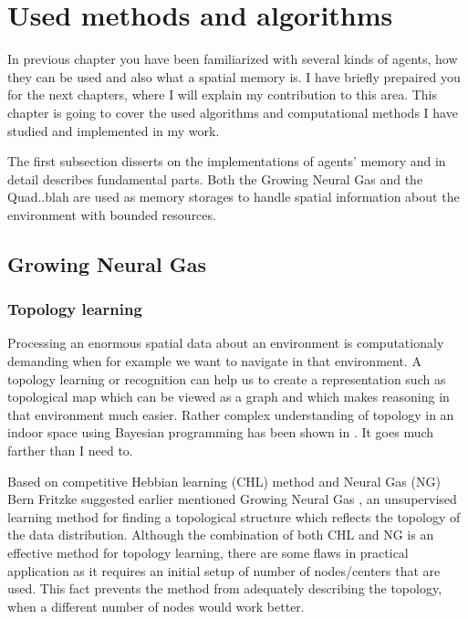 \chapter{Used methods and algorithms}

In previous chapter you have been familiarized with several kinds of agents, how they can be used and also what a spatial memory is. I have briefly prepaired you for the next chapters, where I will explain my contribution to this area. This chapter is going to cover the used algorithms and computational methods I have studied and implemented in my work. 

The first subsection disserts on the implementations of agents' memory and in detail describes fundamental parts. Both the Growing Neural Gas and the Quad..blah are used as memory storages to handle spatial information about the environment with bounded resources.

\section{Growing Neural Gas}

\subsection{Topology learning}

Processing an enormous spatial data about an environment is computationaly demanding when for example we want to navigate in that environment. A topology learning or recognition can help us to create a representation such as topological map which can be viewed as a graph and which makes reasoning in that environment much easier. Rather complex understanding of topology in an indoor space using Bayesian programming has been shown in \cite{Tapus:topologylearning}. It goes much farther than I need to. 

Based on competitive Hebbian learning (CHL) method \cite{Martinetz:chl} and Neural Gas (NG) \cite{Martinetz:ng} Bern Fritzke suggested earlier mentioned Growing Neural Gas \cite{Fritzke:gng}, an unsupervised learning method for finding a topological structure which reflects the topology of the data distribution. Although the combination of both CHL and NG is an effective method for topology learning, there are some flaws in practical application as it requires an initial setup of number of nodes/centers that are used. This fact prevents the method from adequately describing the topology, when a different number of nodes would work better.

